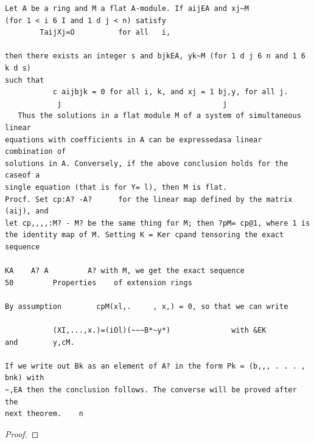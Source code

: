 \begin{theorem}\label{mcrt-auto-theorem-7-6}\uses{}
\begin{verbatim}
Let A be a ring and M a flat A-module. If aijEA and xj~M
(for 1 < i 6 I and 1 d j < n) satisfy
        TaijXj=O          for all   i,

then there exists an integer s and bjkEA, yk~M (for 1 d j 6 n and 1 6 k d s)
such that
           c aijbjk = 0 for all i, k, and xj = 1 bj,y, for all j.
            j                                     j
   Thus the solutions in a flat module M of a system of simultaneous linear
equations with coefficients in A can be expressedasa linear combination of
solutions in A. Conversely, if the above conclusion holds for the caseof a
single equation (that is for Y= l), then M is flat.
Procf. Set cp:A? -A?      for the linear map defined by the matrix (aij), and
let cp,,,,:M? - M? be the same thing for M; then ?pM= cp@1, where 1 is
the identity map of M. Setting K = Ker cpand tensoring the exact sequence

KA    A? A         A? with M, we get the exact sequence
50         Properties    of extension rings

By assumption        cpM(xl,.     , x,) = 0, so that we can write

           (XI,...,x.)=(iOl)(~~~B*~y*)              with &EK        and        y,cM.

If we write out Bk as an element of A? in the form Pk = (b,,, . . . , bnk) with
~,EA then the conclusion follows. The converse will be proved after the
next theorem.    n
\end{verbatim}
\end{theorem}
\begin{proof}
\notready
\end{proof}


